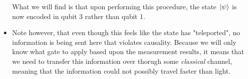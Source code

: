 \begin{itemize}
			What we will find is that upon performing this procedure, the state \( \ket*{\psi} \) is now encoded 
			in qubit 3 rather than qubit 1. 
		\item Note however, that even though this feels like the state has "teleported", no information is being 
			sent here that violates causality. Because we will only know what gate to apply based upon 
			the measurement results, it means that we need to transfer this information over 
			thorugh some \textit{classical} channel, meaning that the information could not possibly travel 
			faster than light. 

\end{itemize}

